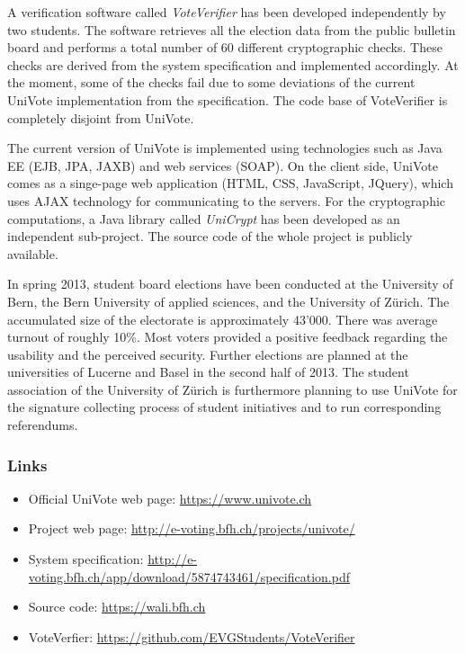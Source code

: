 \documentclass[bibtotoc,halfparskip,oneside]{scrreprt}
\begin{document}
A verification software called \emph{VoteVerifier} has been developed independently by two students. The software retrieves all the election data from the public bulletin board and performs a total number of 60 different cryptographic checks. These checks are derived from the system specification and implemented accordingly. At the moment, some of the checks fail due to some deviations of the current UniVote implementation from the specification. The code base of VoteVerifier is completely disjoint from UniVote.

The current version of UniVote is implemented using technologies such as Java EE (EJB, JPA, JAXB) and web services (SOAP). On the client side, UniVote comes as a singe-page web application (HTML, CSS, JavaScript, JQuery), which uses AJAX technology for communicating to the servers. For the cryptographic computations, a Java library called \emph{UniCrypt} has been developed as an independent sub-project. The source code of the whole project is publicly available.

In spring 2013, student board elections have been conducted at the University of Bern, the Bern University of applied sciences, and the University of Zürich. The accumulated size of the electorate is approximately 43'000. There was average turnout of roughly 10\%. Most voters provided a positive feedback regarding the usability and the perceived security. Further elections are planned at the universities of Lucerne and Basel in the second half of 2013. The student association of the University of Zürich is furthermore planning to use UniVote for the signature collecting process of  student initiatives and to run corresponding referendums.

\subsubsection{Links}
\begin{itemize}
	\item Official UniVote web page: \href{https://www.univote.ch}{https://www.univote.ch} 
	\item Project web page: \href{http://e-voting.bfh.ch/projects/univote/}{http://e-voting.bfh.ch/projects/univote/}
	\item System specification: \href{http://e-voting.bfh.ch/app/download/5874743461/specification.pdf}{http://e-voting.bfh.ch/app/download/5874743461/specification.pdf}
	\item Source code: \href{https://wali.bfh.ch}{https://wali.bfh.ch}
	\item VoteVerfier: \href{https://github.com/EVGStudents/VoteVerifier}{https://github.com/EVGStudents/VoteVerifier}

\end{itemize}
\end{document}
